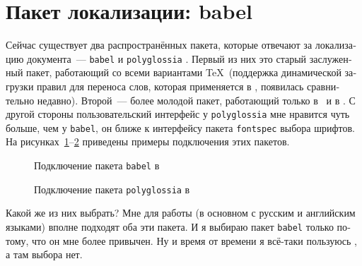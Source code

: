 \documentclass[a4paper,12pt,hyphens]{article}
\newcommand\package[1]{\texttt{#1}}
\begin{document}
\section{Пакет локализации: babel}
Сейчас существует два распространённых пакета, которые отвечают за
локализацию документа~---
\package{babel} \parencite{ctan-babel} и
\package{polyglossia} \parencite{ctan-polyglossia}.
Первый из них это старый заслуженный пакет, работающий со всеми
вариантами \TeX\ (поддержка динамической загрузки правил для
переноса слов, которая применяется в \LuaTeX, появилась сравнительно
недавно). Второй~--- более молодой пакет, работающий только в \XeLaTeX\ и в \LuaLaTeX.
С другой стороны
пользовательский интерфейс у \package{polyglossia} мне нравится чуть больше,
чем у \package{babel}, он ближе к интерфейсу пакета \package{fontspec}
выбора шрифтов. На рисунках~\ref{babel2}--\ref{polygl1}
приведены примеры подключения этих пакетов.
\begin{figure}[tp]
\begin{latexcode}
\usepackage[english,russian]{babel}
\end{latexcode}
\caption{Подключение пакета \package{babel} в \LuaLaTeX}\label{babel2}
\end{figure}
\begin{figure}[tp]
\begin{latexcode}
\usepackage{polyglossia}
\setmainlanguage{russian}
\end{latexcode}
\caption{Подключение пакета \package{polyglossia} в \LuaLaTeX}\label{polygl1}
\end{figure}

Какой же из них выбрать? Мне для работы (в основном с русским и английским языками)
вполне подходят оба эти пакета. И я выбираю пакет \package{babel} только потому, что
он мне более привычен. Ну и время от времени я всё-таки пользуюсь \pdfLaTeX, а там
выбора нет.
\end{document}
